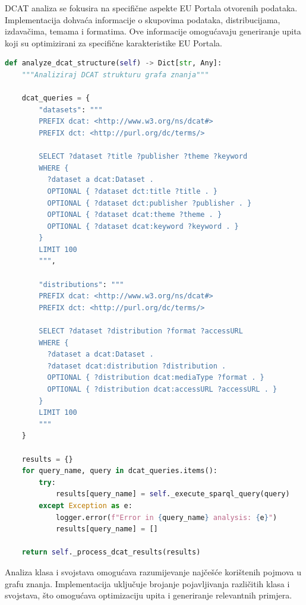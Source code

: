 DCAT analiza se fokusira na specifične aspekte EU Portala otvorenih podataka. Implementacija dohvaća informacije o skupovima podataka, distribucijama, izdavačima, temama i formatima. Ove informacije omogućavaju generiranje upita koji su optimizirani za specifične karakteristike EU Portala.

\begin{lstlisting}[language=Python, caption=Implementacija DCAT analize]
def analyze_dcat_structure(self) -> Dict[str, Any]:
    """Analiziraj DCAT strukturu grafa znanja"""
    
    dcat_queries = {
        "datasets": """
        PREFIX dcat: <http://www.w3.org/ns/dcat#>
        PREFIX dct: <http://purl.org/dc/terms/>
        
        SELECT ?dataset ?title ?publisher ?theme ?keyword
        WHERE {
          ?dataset a dcat:Dataset .
          OPTIONAL { ?dataset dct:title ?title . }
          OPTIONAL { ?dataset dct:publisher ?publisher . }
          OPTIONAL { ?dataset dcat:theme ?theme . }
          OPTIONAL { ?dataset dcat:keyword ?keyword . }
        }
        LIMIT 100
        """,
        
        "distributions": """
        PREFIX dcat: <http://www.w3.org/ns/dcat#>
        PREFIX dct: <http://purl.org/dc/terms/>
        
        SELECT ?dataset ?distribution ?format ?accessURL
        WHERE {
          ?dataset a dcat:Dataset .
          ?dataset dcat:distribution ?distribution .
          OPTIONAL { ?distribution dcat:mediaType ?format . }
          OPTIONAL { ?distribution dcat:accessURL ?accessURL . }
        }
        LIMIT 100
        """
    }
    
    results = {}
    for query_name, query in dcat_queries.items():
        try:
            results[query_name] = self._execute_sparql_query(query)
        except Exception as e:
            logger.error(f"Error in {query_name} analysis: {e}")
            results[query_name] = []
    
    return self._process_dcat_results(results)
\end{lstlisting}

Analiza klasa i svojstava omogućava razumijevanje najčešće korištenih pojmova u grafu znanja. Implementacija uključuje brojanje pojavljivanja različitih klasa i svojstava, što omogućava optimizaciju upita i generiranje relevantnih primjera.

